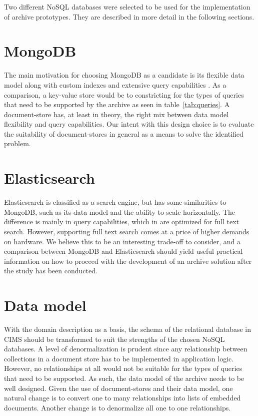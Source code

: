 Two different NoSQL databases were selected to be used for the implementation of archive prototypes. They are described in more detail in the following sections.

\section{MongoDB}
The main motivation for choosing MongoDB as a candidate is its flexible data model along with custom indexes and extensive query capabilities \cite{Catell}. As a comparison, a key-value store would be to constricting for the types of queries that need to be supported by the archive as seen in table~\ref{tab:queries}. A document-store has, at least in theory, the right mix between data model flexibility and query capabilities. Our intent with this design choice is to evaluate the suitability of document-stores in general as a means to solve the identified problem. 

\section{Elasticsearch}
Elasticsearch is classified as a search engine, but has some similarities to MongoDB, such as its data model and the ability to scale horizontally. The difference is mainly in query capabilities, which in are optimized for full text search. However, supporting full text search comes at a price of higher demands on hardware. We believe this to be an interesting trade-off to consider, and a comparison between MongoDB and Elasticsearch should yield useful practical information on how to proceed with the development of an archive solution after the study has been conducted.

\section{Data model}
With the domain description as a basis, the schema of the relational database in CIMS should be transformed to suit the strengths of the chosen NoSQL databases. A level of denormalization is prudent since any relationship between collections in a document store has to be implemented in application logic. However, no relationships at all would not be suitable for the types of queries that need to be supported. As such, the data model of the archive needs to be well designed. Given the use of document-stores and their data model, one natural change is to convert one to many relationships into lists of embedded documents. Another change is to denormalize all one to one relationships.

